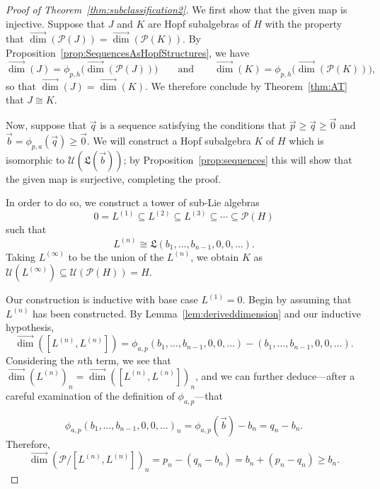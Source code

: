 \documentclass[11pt]{amsart}
\theoremstyle{definition}
\numberwithin{equation}{section}
\newcommand{\vecdim}{\overrightarrow{\dim}}
\begin{document}
\begin{proof}[Proof of Theorem~\ref{thm:subclassification2}]
We first show that the given map is injective.  Suppose that $J$ and $K$ are Hopf subalgebras of $H$ with the property that $\vecdim(\mathcal{P}(J)) = \vecdim(\mathcal{P}(K))$.  By Proposition~\ref{prop:SequencesAsHopfStructures}, we have
\[
\vecdim(J) = \phi_{p, h}\big(\vecdim(\mathcal{P}(J))\big)
\qquad\text{and}\qquad
\vecdim(K) = \phi_{p, h}\big(\vecdim(\mathcal{P}(K))\big),
\]
so that $\vecdim(J) = \vecdim(K)$.  We therefore conclude by Theorem~\ref{thm:AT} that $J \cong K$.

Now, suppose that $\vec{q}$ is a sequence satisfying the conditions that $\vec{p} \ge \vec{q} \ge \vec{0}$ and $\vec{b} = \phi_{p, a}(\vec{q}) \ge \vec{0}$.  
We will construct a Hopf subalgebra $K$ of $H$ which is isomorphic to $\mathcal{U}(\mathfrak{L}(\vec{b}))$; by Proposition~\ref{prop:sequences} this will show that the given map is surjective, completing the proof.

In order to do so, we construct a tower of sub-Lie algebras 
\[
0 = L^{(1)} \subseteq L^{(2)} \subseteq L^{(3)} \subseteq \cdots \subseteq \mathcal{P}(H)
\]
such that 
\[
L^{(n)} \cong \mathfrak{L}(b_{1}, \ldots, b_{n-1}, 0, 0, \ldots).
\]
Taking $L^{(\infty)}$ to be the union of the $L^{(n)}$, we obtain $K$ as $\mathcal{U}(L^{(\infty)}) \subseteq \mathcal{U}(\mathcal{P}(H)) = H$.

Our construction is inductive with base case $L^{(1)} = 0$.  
Begin by assuming that $L^{(n)}$ has been constructed.  
By Lemma~\ref{lem:deriveddimension} and our inductive hypothesis,
\[
\vecdim([L^{(n)}, L^{(n)}])
 = 
\phi_{a, p}(b_{1}, \ldots, b_{n-1}, 0, 0, \ldots) - (b_{1}, \ldots, b_{n-1}, 0, 0, \ldots).
\]
Considering the $n$th term, we see that $\vecdim(L^{(n)})_{n} = \vecdim([L^{(n)}, L^{(n)}])_{n}$, and we can further deduce---after a careful examination of the definition of $\phi_{a, p}$---that

\begin{equation}
\label{eq:inductivedimensionequality}
\phi_{a, p}(b_{1}, \ldots, b_{n-1}, 0, 0, \ldots)_{n}
=
\phi_{a, p}(\vec{b}) - b_{n}
=
q_{n} - b_{n}.
\end{equation}
Therefore,
\[
\vecdim\left( \mathcal{P} \big/ [L^{(n)}, L^{(n)}] \right)_{n}
= p_{n} - (q_{n} - b_{n})
= b_{n} + (p_{n} - q_{n})
\ge b_{n}.
\]


\end{proof}
\end{document}
